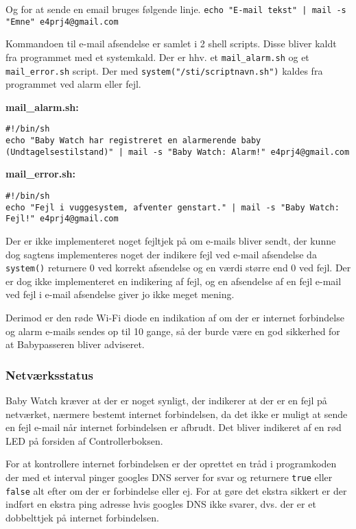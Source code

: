 Og for at sende en email bruges følgende linje. \newline
\verb+echo "E-mail tekst" | mail -s "Emne" e4prj4@gmail.com+

Kommandoen til e-mail afsendelse er samlet i 2 shell scripts. Disse bliver kaldt fra programmet med et systemkald. Der er hhv. et \verb+mail_alarm.sh+ og et \verb+mail_error.sh+ script. Der med \verb+system("/sti/scriptnavn.sh")+ kaldes fra programmet ved alarm eller fejl.

\textbf{mail\_alarm.sh:}
\begin{lstlisting}
#!/bin/sh
echo "Baby Watch har registreret en alarmerende baby (Undtagelsestilstand)" | mail -s "Baby Watch: Alarm!" e4prj4@gmail.com
\end{lstlisting}

\textbf{mail\_error.sh:}
\begin{lstlisting}
#!/bin/sh
echo "Fejl i vuggesystem, afventer genstart." | mail -s "Baby Watch: Fejl!" e4prj4@gmail.com
\end{lstlisting}

Der er ikke implementeret noget fejltjek på om e-mails bliver sendt, der kunne dog sagtens implementeres noget der indikere fejl ved e-mail afsendelse da \verb+system()+ returnere 0 ved korrekt afsendelse og en værdi større end 0 ved fejl. Der er dog ikke implementeret en indikering af fejl, og en afsendelse af en fejl e-mail ved fejl i e-mail afsendelse giver jo ikke meget mening.

Derimod er den røde Wi-Fi diode en indikation af om der er internet forbindelse og alarm e-mails sendes op til 10 gange, så der burde være en god sikkerhed for at Babypasseren bliver adviseret.

\subsubsection*{Netværksstatus}

Baby Watch kræver at der er noget synligt, der indikerer at der er en fejl på netværket, nærmere bestemt internet forbindelsen, da det ikke er muligt at sende en fejl e-mail når internet forbindelsen er afbrudt. Det bliver indikeret af en rød LED på forsiden af Controllerboksen.

For at kontrollere internet forbindelsen er der oprettet en tråd i programkoden der med et interval pinger googles DNS server for svar og returnere \verb+true+ eller \verb+false+ alt efter om der er forbindelse eller ej. For at gøre det ekstra sikkert er der indført en ekstra ping adresse hvis googles DNS ikke svarer, dvs. der er et dobbelttjek på internet forbindelsen.

